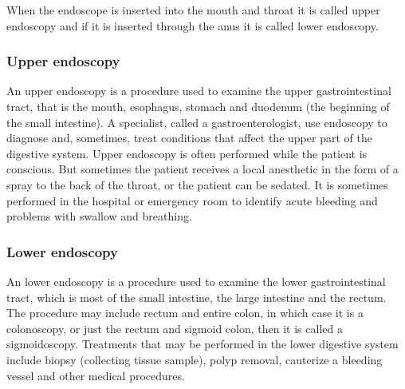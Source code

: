 \documentclass[thesis.tex]{subfiles}
\begin{document}
\medbreak
When the endoscope is inserted into the mouth and throat it is called upper endoscopy and if it is inserted through the anus it is called lower endoscopy. 

\subsubsection{Upper endoscopy}
An upper endoscopy is a procedure used to examine the upper gastrointestinal tract, that is the mouth, esophagus, stomach and duodenum (the beginning of the small intestine). A specialist, called a gastroenterologist, use endoscopy to diagnose and, sometimes, treat conditions that affect the upper part of the digestive system. Upper endoscopy is often performed while the patient is conscious. But sometimes the patient receives a local anesthetic in the form of a spray to the back of the throat, or the patient can be sedated. It is sometimes performed in the hospital or emergency room to identify acute bleeding and problems with swallow and breathing.

\subsubsection{Lower endoscopy}
An lower endoscopy is a procedure used to examine the lower gastrointestinal tract, which is  most of the small intestine, the large intestine and the rectum. The procedure may include rectum and entire colon, in which case it is a colonoscopy, or just the rectum and sigmoid colon, then it is called a sigmoidoscopy. Treatments that may be performed in the lower digestive system include biopsy (collecting tissue sample), polyp removal, cauterize a bleeding vessel and other medical procedures.
\bigbreak \noindent
\end{document}
